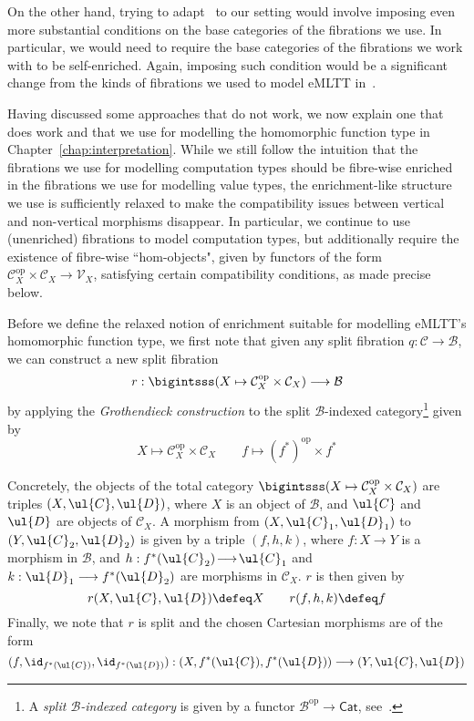 On the other hand, trying to adapt~\cite[Section~8.1]{Vasilakopoulou:Thesis} to our setting would involve imposing even more substantial conditions on the base categories of the fibrations we use. In particular, we would need to require the  base categories of the fibrations we work with to be self-enriched. Again, imposing such condition would be a significant change from the kinds of fibrations we used to model eMLTT in~\cite{Ahman:FibredEffects}.

Having discussed some approaches that do not work, we now explain one that does work and that we use for modelling the homomorphic function type in Chapter~\ref{chap:interpretation}. While we still follow the intuition that the fibrations we use for modelling computation types should be fibre-wise enriched in the fibrations we use for modelling value types, the enrichment-like structure we use is sufficiently relaxed to make the compatibility issues between vertical and non-vertical morphisms disappear. In particular, we continue to use (unenriched) fibrations to model computation types, but additionally require the existence of fibre-wise ``hom-objects", given by functors of the form $\mathcal{C}^{\text{op}}_X \times \mathcal{C}_X \longrightarrow \mathcal{V}_X$, satisfying certain compatibility conditions, as made precise below.


Before we define the relaxed notion of enrichment suitable for modelling eMLTT's homomorphic function type, we first note that 
given any split fibration $q : \mathcal{C} \longrightarrow \mathcal{B}$, we can construct a new split fibration
\vspace{-0.25cm}
\[
\begin{array}{c}
r : \bigintsss (X \mapsto \mathcal{C}^{\text{op}}_X \times \mathcal{C}_X) \longrightarrow \mathcal{B}
\end{array}
\]
by applying the
\!\emph{Grothendieck construction} to the split $\mathcal{B}$-indexed category\footnote{A \emph{split $\mathcal{B}$-indexed category} is given by a functor $\mathcal{B}^{\text{op}} \longrightarrow \mathsf{Cat}$, see~\cite[Definition~1.4.4 (ii)]{Jacobs:Book}.} given by 
\[
X \mapsto \mathcal{C}^{\text{op}}_X \times \mathcal{C}_X
\qquad
f \mapsto (f^*)^{\text{op}} \times f^*
\]

Concretely, the objects of the total category $\bigintsss (X \mapsto \mathcal{C}^{\text{op}}_X \times \mathcal{C}_X)$ are triples $(X , \ul{C}, \ul{D})$, where $X$ is an object of $\mathcal{B}$, and $\ul{C}$ and $\ul{D}$ are objects of $\mathcal{C}_X$. A morphism from $(X , \ul{C}_1, \ul{D}_1)$ to $(Y , \ul{C}_2, \ul{D}_2)$ is given by a triple $(f,h,k)$, where $f : X \longrightarrow Y$ is a morphism in $\mathcal{B}$, and $h : f^*(\ul{C}_2) \!\longrightarrow\! \ul{C}_1$ and $k : \ul{D}_1 \longrightarrow f^*(\ul{D}_2)$ are morphisms in $\mathcal{C}_{X}$.  $r$ is then given by 
\[
r(X , \ul{C}, \ul{D}) \defeq X \qquad r(f,h,k) \defeq f
\] 
Finally, we note that $r$ is split and the chosen Cartesian morphisms are of the form 
\[
(f , \id_{f^*(\ul{C})} , \id_{f^*(\ul{D})}) : (X , f^*(\ul{C}),f^*(\ul{D})) \longrightarrow (Y,\ul{C},\ul{D})
\]

